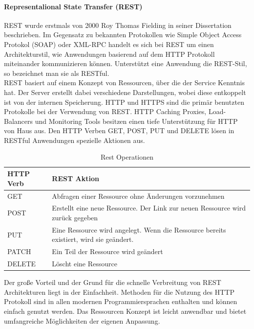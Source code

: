 	\paragraph{Representalional State Transfer (REST)}
		REST wurde erstmals von 2000 Roy Thomas Fielding in seiner Dissertation beschrieben. Im Gegensatz zu bekannten Protokollen wie Simple Object Access Protokol (SOAP) oder XML-RPC handelt es sich bei REST um einen Architekturstil, wie Anwendungen basierend auf dem HTTP Protokoll miteinander kommunizieren können. Unterstützt eine Anwendung die REST-Stil, so bezeichnet man sie als RESTful.
		\cite[vgl.][]{Melzer.2010} \\
		REST basiert auf einem Konzept von Ressourcen, über die der Service Kenntnis hat. Der Server erstellt dabei verschiedene Darstellungen, wobei diese entkoppelt ist von der internen Speicherung.
		HTTP und HTTPS sind die primär benutzten Protokolle bei der Verwendung von REST. HTTP Caching Proxies, Load-Balancers und Monitoring Tools besitzen einen tiefe Unterstützung für HTTP von Haus aus.
		Den HTTP Verben GET, POST, PUT und DELETE lösen in RESTful Anwendungen spezielle Aktionen aus.
		\\
		
		\begin{table}[h]
		
		\begin{tabular}{|p{3.5cm}|p{12.5cm}|}
		\hline 
		\textbf{HTTP Verb} & \textbf{REST Aktion} \\ 
		\hline 
		GET & Abfragen einer Ressource ohne Änderungen vorzunehmen \\ 
		\hline 
		POST & Erstellt eine neue Ressource. Der Link zur neuen Ressource wird zurück gegeben \\ 
		\hline 
		PUT & Eine Ressource wird angelegt. Wenn die Ressource bereits existiert, wird sie geändert. \\ 
		\hline 
		PATCH & Ein Teil der Ressource wird geändert \\ 
		\hline 
		DELETE & Löscht eine Ressource \\ 
		\hline 
		\end{tabular} 
		\caption{Rest Operationen}
		\end{table}
		
		Der große Vorteil und der Grund für die schnelle Verbreitung von REST Architekturen liegt in der Einfachheit. Methoden für die Nutzung des HTTP Protokoll sind in allen modernen Programmiersprachen enthalten und können einfach genutzt werden. Das Ressourcen Konzept ist leicht anwendbar und bietet umfangreiche Möglichkeiten der eigenen Anpassung.
		
